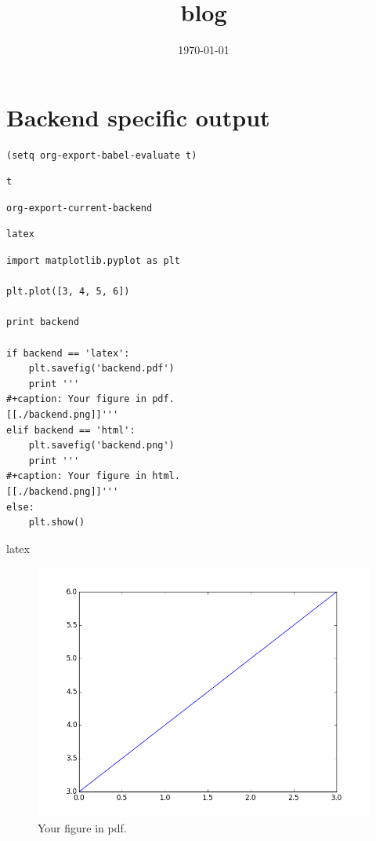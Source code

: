 \documentclass[11pt]{article}
\date{\today}
\title{blog}
\begin{document}
\section{Backend specific output}
\label{sec-1}

\begin{verbatim}
(setq org-export-babel-evaluate t)
\end{verbatim}

\begin{verbatim}
t
\end{verbatim}

\begin{verbatim}
org-export-current-backend
\end{verbatim}

\begin{verbatim}
latex
\end{verbatim}



\begin{verbatim}
import matplotlib.pyplot as plt

plt.plot([3, 4, 5, 6])

print backend

if backend == 'latex':
    plt.savefig('backend.pdf')
    print '''
#+caption: Your figure in pdf.
[[./backend.png]]'''
elif backend == 'html':
    plt.savefig('backend.png')
    print '''
#+caption: Your figure in html.
[[./backend.png]]'''
else:
    plt.show()
\end{verbatim}

latex

\begin{figure}[htb]
\centering
\includegraphics[width=.9\linewidth]{./backend.png}
\caption{Your figure in pdf.}
\end{figure}
\end{document}
